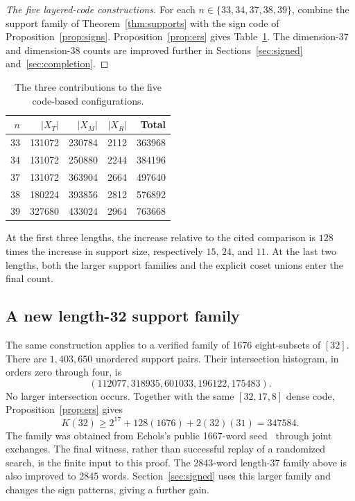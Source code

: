 \begin{proof}[The five layered-code constructions]
For each $n\in\{33,34,37,38,39\}$, combine the support family of
Theorem~\ref{thm:supports} with the sign code of
Proposition~\ref{prop:signs}. Proposition~\ref{prop:ers} gives
Table~\ref{tab:layers}. The dimension-37 and dimension-38 counts are
improved further in Sections~\ref{sec:signed} and~\ref{sec:completion}.
\end{proof}

\begin{table}[ht]
\centering
\caption{The three contributions to the five code-based configurations.}
\label{tab:layers}
\begin{tabular}{rrrrr}
\toprule
$n$&$|X_T|$&$|X_M|$&$|X_R|$&Total\\
\midrule
33&131072&230784&2112&363968\\
34&131072&250880&2244&384196\\
37&131072&363904&2664&497640\\
38&180224&393856&2812&576892\\
39&327680&433024&2964&763668\\
\bottomrule
\end{tabular}
\end{table}

At the first three lengths, the increase relative to the cited
comparison is $128$ times the increase in support size, respectively
$15$, $24$, and $11$. At the last two lengths, both the larger support
families and the explicit coset unions enter the final count.
\subsection{A new length-32 support family}
The same construction applies to a verified family of 1676 eight-subsets
of $[32]$. There are $1,403,650$ unordered support pairs. Their intersection
histogram, in orders zero through four, is
\[
(112077,318935,601033,196122,175483).
\]
No larger intersection occurs. Together with the same $[32,17,8]$ dense
code, Proposition~\ref{prop:ers} gives
\[
K(32)\ge 2^{17}+128(1676)+2(32)(31)=347584.
\]
The family was obtained from Echols's public 1667-word seed~\cite{echols} through joint
exchanges. The final witness, rather than successful replay of a randomized
search, is the finite input to this proof. The 2843-word length-37 family
above is also improved to 2845 words. Section~\ref{sec:signed} uses this
larger family and changes the sign patterns, giving a further gain.
